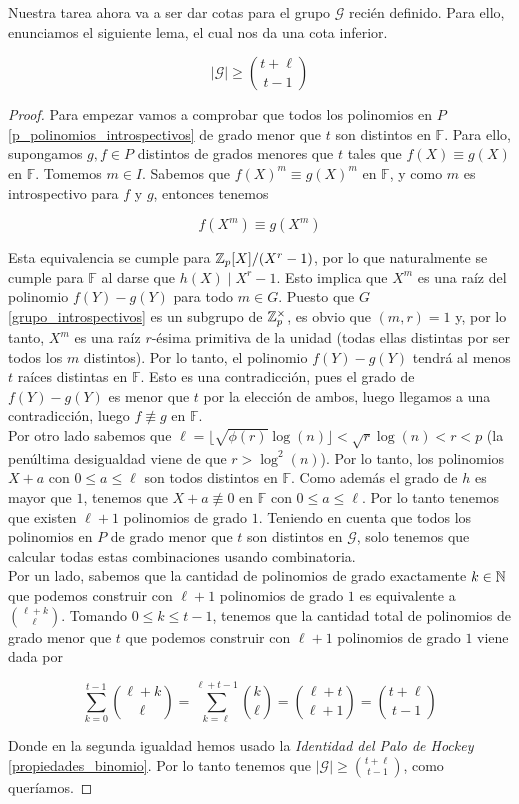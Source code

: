 Nuestra tarea ahora va a ser dar cotas para el grupo $\mathcal{G}$ recién definido. Para ello, enunciamos el siguiente lema, el cual nos da una cota inferior.

\begin{lema}\label{cota_inferior_G}
	\[ |\mathcal{G}| \geq \binom{t+\ell}{t-1} \]
\end{lema}

\begin{proof}
	Para empezar vamos a comprobar que todos los polinomios en $P$ \eqref{p_polinomios_introspectivos} de grado menor que $t$ son distintos en $\mathbb{F}$. Para ello, supongamos $g, f \in P$ distintos de grados menores que $t$ tales que $f(X) \equiv g(X)$ en $\mathbb{F}$. Tomemos $m \in I$. Sabemos que $f(X)^m \equiv g(X)^m$ en $\mathbb{F}$, y como $m$ es introspectivo para $f$ y $g$, entonces tenemos
	
	\[ f(X^m) \equiv g(X^m) \]
	
	Esta equivalencia se cumple para $\mathbb{Z}_p[X]/(X^r - 1)$, por lo que naturalmente se cumple para $\mathbb{F}$ al darse que $h(X) \mid X^r - 1$. Esto implica que $X^m$ es una raíz del polinomio $f(Y) - g(Y)$ para todo $m \in G$. Puesto que $G$ \eqref{grupo_introspectivos} es un subgrupo de $\mathbb{Z}_p^\times$, es obvio que $(m, r) = 1$ y, por lo tanto, $X^m$ es una raíz $r$-ésima primitiva de la unidad (todas ellas distintas por ser todos los $m$ distintos). Por lo tanto, el polinomio $f(Y) - g(Y)$ tendrá al menos $t$ raíces distintas en $\mathbb{F}$. Esto es una contradicción, pues el grado de $f(Y) - g(Y)$ es menor que $t$ por la elección de ambos, luego llegamos a una contradicción, luego $f \not\equiv g$ en $\mathbb{F}$.\\
	
	Por otro lado sabemos que $\ell = \lfloor \sqrt{\phi(r)}\log(n) \rfloor < \sqrt{r}\log(n) < r < p$ (la penúltima desigualdad viene de que $r > \log^2(n)$). Por lo tanto, los polinomios $X + a$ con $0 \leq a \leq \ell$ son todos distintos en $\mathbb{F}$. Como además el grado de $h$ es mayor que $1$, tenemos que $X + a \not\equiv 0$ en $\mathbb{F}$ con $0 \leq a \leq \ell$. Por lo tanto tenemos que existen $\ell + 1$ polinomios de grado $1$. Teniendo en cuenta que todos los polinomios en $P$ de grado menor que $t$ son distintos en $\mathcal{G}$, solo tenemos que calcular todas estas combinaciones usando combinatoria.\\
	
	Por un lado, sabemos que la cantidad de polinomios de grado exactamente $k \in \mathbb{N}$ que podemos construir con $\ell + 1$ polinomios de grado $1$ es equivalente a $\binom{\ell+k}{\ell}$. Tomando $0 \leq k \leq t-1$, tenemos que la cantidad total de polinomios de grado menor que $t$ que podemos construir con $\ell + 1$ polinomios de grado $1$ viene dada por
	
	\[ \sum_{k=0}^{t-1}\binom{\ell+k}{\ell} = \sum_{k=\ell}^{\ell+t-1}\binom{k}{\ell} = \binom{\ell + t}{\ell + 1} = \binom{t + \ell}{t - 1} \]
	
	Donde en la segunda igualdad hemos usado la \textit{Identidad del Palo de Hockey} \ref{propiedades_binomio}. Por lo tanto tenemos que $|\mathcal{G}| \geq \binom{t + \ell}{t - 1}$, como queríamos.
\end{proof}

